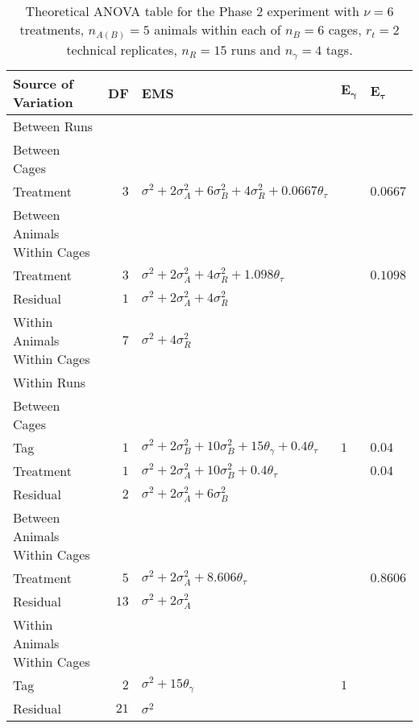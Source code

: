 \begin{table}[ht]
\centering
 \caption{Theoretical ANOVA table for the Phase 2 experiment with $\nu = 6$ treatments, $n_{A(B)} = 5$ animals within each of $n_B = 6$ cages, $r_t = 2$ technical replicates, $n_R = 15$ runs and $n_\gamma = 4$ tags.}
 \begin{tabular}[t]{lrlll} 
 \toprule 
 \multicolumn{1}{l}{\textbf{Source of Variation}} & \multicolumn{1}{l}{\textbf{DF}} & \multicolumn{1}{l}{\textbf{EMS}}& \multicolumn{1}{l}{$\bm{E_{\gamma}}$}&\multicolumn{1}{l}{$\bm{E_{\tau}}$}\\ 
 \midrule 
 Between Runs &  &  & & \\ 
 \quad Between Cages &  &  & & \\ 
 \quad \quad Treatment & $3$ & $\sigma^2+2\sigma_{A}^2+6\sigma_{B}^2+4\sigma_{R}^2+0.0667\theta_{\tau}$ & & $0.0667$\\ \hline 
 \quad Between Animals Within Cages &  &  & & \\ 
 \quad \quad Treatment & $3$ & $\sigma^2+2\sigma_{A}^2+4\sigma_{R}^2+ 1.098\theta_{\tau}$ & & $0.1098$\\ 
 \quad \quad Residual & $1$ & $\sigma^2+2\sigma_{A}^2+4\sigma_{R}^2$ & & \\ \hline 
 \quad Within Animals Within Cages & $7$ & $\sigma^2+4\sigma_{R}^2$ & & \\ \hline 
 Within Runs &  &  & & \\ 
 \quad Between Cages &  &  & & \\ 
 \quad \quad Tag & $1$ & $\sigma^2+2\sigma_{B}^2+10\sigma_{B}^2+15\theta_{\gamma}+0.4\theta_{\tau}$ &$1$ & $0.04$\\ 
 \quad \quad Treatment & $1$ & $\sigma^2+2\sigma_{A}^2+10\sigma_{B}^2+0.4\theta_{\tau}$ & & $0.04$\\ 
 \quad \quad Residual & $2$ & $\sigma^2+2\sigma_{A}^2+6\sigma_{B}^2$ & & \\ \hline 
 \quad Between Animals Within Cages &  &  & & \\ 
 \quad \quad Treatment & $5$ & $\sigma^2+2\sigma_{A}^2+8.606\theta_{\tau}$ & & $ 0.8606$\\ 
 \quad \quad Residual & $13$ & $\sigma^2+2\sigma_{A}^2$ & & \\ \hline 
 \quad Within Animals Within Cages &  &  & & \\ 
 \quad \quad Tag & $2$ & $\sigma^2+15\theta_{\gamma}$ &$1$ & \\ 
 \quad \quad Residual & $21$ & $\sigma^2$ & & \\ 
 \bottomrule 
 \end{tabular} 
 \label{tab:Phase2ANOVABIBD} 
\end{table} 

